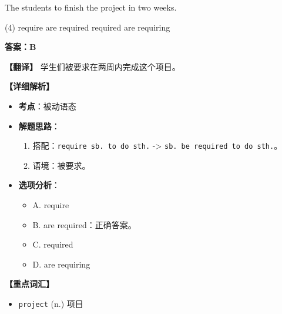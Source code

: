 \documentclass[11pt, a4paper]{article}
\newcommand{\analysis}[4]{
    \begin{solutionbox}
        \textbf{答案：#1}
        
        \textbf{【翻译】} #2
        
        \textbf{【详细解析】}
        #3
        
        \textbf{【重点词汇】}
        #4
    \end{solutionbox}
}
\newcommand{\blank}{\underline{\hspace{1.5cm}}}
\begin{document}
\begin{questions}
    \item The students \blank to finish the project in two weeks.
    \begin{tasks}(4)
        \task require \task are required \task required \task are requiring
    \end{tasks}
    \analysis{B}{学生们被要求在两周内完成这个项目。}{
        \begin{itemize}
            \item \textbf{考点}：被动语态
            \item \textbf{解题思路}：
                \begin{enumerate}
                    \item 搭配：\texttt{require sb. to do sth.} -> \texttt{sb. be required to do sth.}。
                    \item 语境：被要求。
                \end{enumerate}
            \item \textbf{选项分析}：
                \begin{itemize}
                    \item A. require
                    \item B. are required：正确答案。
                    \item C. required
                    \item D. are requiring
                \end{itemize}
        \end{itemize}
    }{
        \begin{itemize}
            \item \texttt{project} (n.) 项目
        \end{itemize}
    }


\end{questions}
\end{document}
